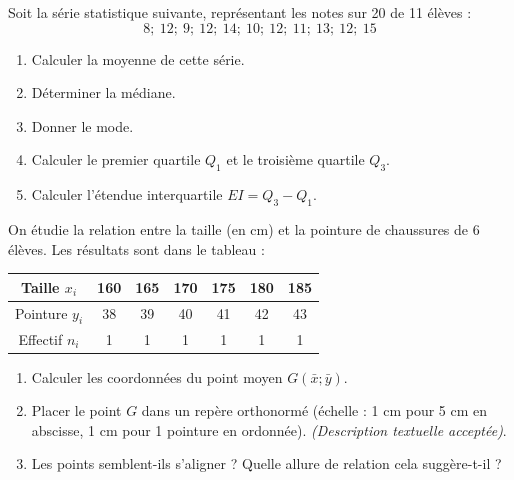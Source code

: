 \documentclass[11pt]{article}
\begin{document}
\begin{exercice}
Soit la série statistique suivante, représentant les notes sur 20 de 11 élèves :
\[ 8;\ 12;\ 9;\ 12;\ 14;\ 10;\ 12;\ 11;\ 13;\ 12;\ 15 \]
\begin{enumerate}
    \item Calculer la moyenne de cette série.
    \item Déterminer la médiane.
    \item Donner le mode.
    \item Calculer le premier quartile $Q_1$ et le troisième quartile $Q_3$.
    \item Calculer l'étendue interquartile $EI = Q_3 - Q_1$.
\end{enumerate}
\end{exercice}

\begin{exercice}
On étudie la relation entre la taille (en cm) et la pointure de chaussures de 6 élèves. Les résultats sont dans le tableau :
\begin{center}
\begin{tabular}{|c|c|c|c|c|c|c|}
\hline
Taille $x_i$ & 160 & 165 & 170 & 175 & 180 & 185 \\
\hline
Pointure $y_i$ & 38 & 39 & 40 & 41 & 42 & 43 \\
\hline
Effectif $n_i$ & 1 & 1 & 1 & 1 & 1 & 1 \\
\hline
\end{tabular}
\end{center}
\begin{enumerate}
    \item Calculer les coordonnées du point moyen $G(\bar{x}; \bar{y})$.
    \item Placer le point $G$ dans un repère orthonormé (échelle : 1 cm pour 5 cm en abscisse, 1 cm pour 1 pointure en ordonnée). \textit{(Description textuelle acceptée)}.
    \item Les points semblent-ils s'aligner ? Quelle allure de relation cela suggère-t-il ?
\end{enumerate}
\end{exercice}
\end{document}
